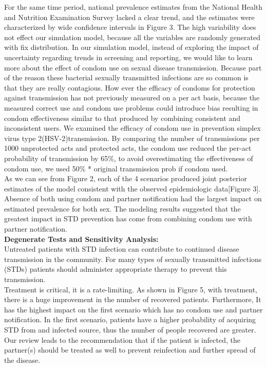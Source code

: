 \documentclass{article}
\begin{document}
\begin{normalsize}
 For the same time period, national prevalence estimates from the National Health and Nutrition Examination Survey lacked a clear trend, and the estimates were characterized by wide confidence intervals in Figure 3. The high variability does not effect our simulation model, because all the variables are randomly generated with fix distribution. 
 In our simulation model, instead of exploring the impact of uncertainty regarding trends in screening and reporting, we would like to learn more about the effect of condom use on sexual disease transmission. Because part of the reason these bacterial sexually transmitted infections are so common is that they are really contagious.
 How ever the efficacy of condoms for protection against transmission has not previously measured on a per act basis, because the measured correct use and condom use problems could introduce bias resulting in condom effectiveness similar to that produced by combining consistent and inconsistent users.
 We examined the efficacy of condom use in prevention simplex virus type 2(HSV-2)transmission. By comparing the number of transmissions per 1000 unprotected acts and protected acts, the condom use reduced the per-act probability of transmission by 65\%, to avoid overestimating the effectiveness of condom use, we used 50\% * original transmission prob if condom used. \\
 

 
 As we can see from Figure 2, each of the 4 scenarios produced joint posterior estimates of the model consistent with the observed epidemiologic data[Figure 3]. Absence of both using condom and partner notification had the largest impact on estimated prevalence for both sex. The modeling results suggested that the greatest impact in STD prevention has come from combining condom use with partner notification.\\
 
\textbf{Degenerate Tests and Sensitivity Analysis:}\\

Untreated patients with STD infection can contribute to continued disease transmission in the community. For many types of sexually transmitted infections (STDs) patients should administer appropriate therapy to prevent this transmission. \\

 Treatment is critical, it is a rate-limiting. As shown in Figure 5, with treatment, there is a huge improvement in the number of recovered patients. Furthermore, It has the highest impact on the first scenario which has no condom use and partner notification. In the first scenario, patients have a higher probability of acquiring STD from and infected source, thus the number of people recovered are greater.  Our review leads to the recommendation that if the patient is infected, the partner(s) should be treated as well to prevent reinfection and further spread of the disease.
 

\end{normalsize}
\end{document}
